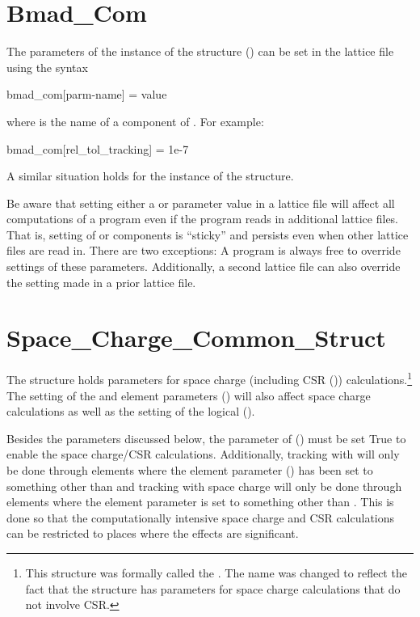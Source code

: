 {%
\section{Bmad_Com}
\label{s:bmad.ptc.com}

The parameters of the  instance of the  structure
() can be set in the lattice file using the syntax
\begin{example}
  bmad_com[parm-name] = value
\end{example}
where  is the name of a component of
. For example:
\begin{example}
  bmad_com[rel_tol_tracking] = 1e-7
\end{example}

A similar situation holds for the  instance of the  structure.

Be aware that setting either a  or  parameter value in a lattice file will
affect all computations of a program even if the program reads in additional lattice files. That is,
setting of  or  components is ``sticky'' and persists even when other
lattice files are read in. There are two exceptions: A program is always free to override settings
of these parameters.  Additionally, a second lattice file can also override the setting made in a
prior lattice file.

\section{Space_Charge_Common_Struct}
\label{s:sc.com}

The  structure holds parameters for space charge (including CSR
()) calculations.\footnote
  {
This structure was formally called the . The name was changed to reflect
the fact that the structure has parameters for space charge calculations that do not involve CSR.
  }
The setting of the  and  element parameters
() will also affect space charge calculations as well as the setting of the
 logical  ().

Besides the parameters discussed below, the  parameter of 
() must be set True to enable the space charge/CSR calculations. Additionally,
tracking with  will only be done through elements where the element parameter
 () has been set to something other than  and tracking with
space charge will only be done through elements where the element parameter 
is set to something other than . This is done so that the computationally intensive space
charge and CSR calculations can be restricted to places where the effects are significant.

}
